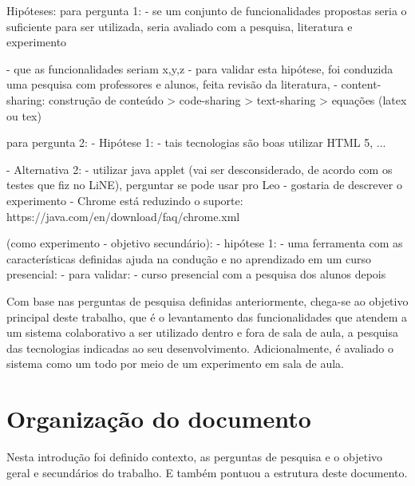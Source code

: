                     Hipóteses:
                    para pergunta 1:
                        - se um conjunto de funcionalidades propostas seria o suficiente para ser utilizada, seria avaliado com a pesquisa, literatura e experimento

                        - que as funcionalidades seriam x,y,z
                            - para validar esta hipótese, foi conduzida uma pesquisa com professores e alunos, feita revisão da literatura, 
                        - content-sharing: construção de conteúdo > code-sharing > text-sharing > equações (latex ou tex)

                    para pergunta 2:
                        - Hipótese 1:
                            - tais tecnologias são boas utilizar HTML 5, ...

                            - Alternativa 2:
                                - utilizar java applet (vai ser desconsiderado, de acordo com os testes que fiz no LiNE), perguntar se pode usar pro Leo - gostaria de descrever o experimento
                                - Chrome está reduzindo o suporte:
                                    https://java.com/en/download/faq/chrome.xml

                    (como experimento - objetivo secundário):
                        - hipótese 1:
                            - uma ferramenta com as características definidas ajuda na condução e no aprendizado em um curso presencial:
                            - para validar:
                                - curso presencial com a pesquisa dos alunos depois





Com base nas perguntas de pesquisa definidas anteriormente, chega-se ao objetivo principal deste trabalho, que é o levantamento das funcionalidades que atendem a um sistema colaborativo a ser utilizado dentro e fora de sala de aula, a pesquisa das tecnologias indicadas ao seu desenvolvimento. Adicionalmente, é avaliado o sistema como um todo por meio de um experimento em sala de aula.

\section{Organização do documento}

Nesta introdução foi definido contexto, as perguntas de pesquisa e o objetivo geral e secundários do trabalho. E também pontuou a estrutura deste documento.

